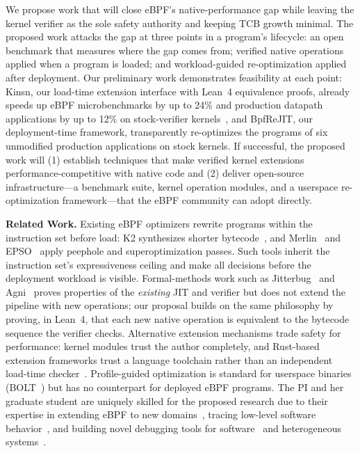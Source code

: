 We propose work that will close eBPF's native-performance gap while leaving the kernel verifier as the sole safety authority and keeping TCB growth minimal.  The proposed work attacks the gap at three points in a program's lifecycle: an open benchmark that measures where the gap comes from; verified native operations applied when a program is loaded; and workload-guided re-optimization applied after deployment.  Our preliminary work demonstrates feasibility at each point: Kinsn, our load-time extension interface with Lean~4 equivalence proofs, already speeds up eBPF microbenchmarks by up to 24\% and production datapath applications by up to 12\% on stock-verifier kernels~\cite{zheng2026kinsn}, and BpfReJIT, our deployment-time framework, transparently re-optimizes the programs of six unmodified production applications on stock kernels.  If successful, the proposed work will (1) establish techniques that make verified kernel extensions performance-competitive with native code and (2) deliver open-source infrastructure---a benchmark suite, kernel operation modules, and a userspace re-optimization framework---that the eBPF community can adopt directly.

\noindent \textbf{Related Work.}
Existing eBPF optimizers rewrite programs within the instruction set before load: K2 synthesizes shorter bytecode~\cite{xu2021synthesizing}, and Merlin~\cite{mao2024merlin} and EPSO~\cite{zhu2025epso} apply peephole and superoptimization passes.  Such tools inherit the instruction set's expressiveness ceiling and make all decisions before the deployment workload is visible.  Formal-methods work such as Jitterbug~\cite{nelson2020specification} and Agni~\cite{vishwanathan2023verifying} proves properties of the \textit{existing} JIT and verifier but does not extend the pipeline with new operations; our proposal builds on the same philosophy by proving, in Lean~4, that each new native operation is equivalent to the bytecode sequence the verifier checks.  Alternative extension mechanisms trade safety for performance: kernel modules trust the author completely, and Rust-based extension frameworks trust a language toolchain rather than an independent load-time checker~\cite{jia2025rex}.  Profile-guided optimization is standard for userspace binaries (\eg BOLT~\cite{panchenko2019bolt}) but has no counterpart for deployed eBPF programs.  The PI and her graduate student are uniquely skilled for the proposed research due to their expertise in extending eBPF to new domains~\cite{zheng2025extending,yang2025egpu}, tracing low-level software behavior~\cite{Quinn_2018_sledgehammer}, and building novel debugging tools for software~\cite{Quinn_2022_omnitable} and heterogeneous systems~\cite{Ma_2022_bnw}.

